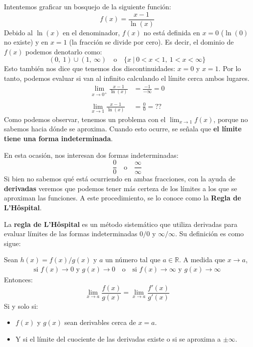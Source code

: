 \documentclass[12pt]{article}
\begin{document}
Intentemos graficar un bosquejo de la siguiente función:
\[
	f(x) = \frac{x - 1}{\ln(x)}
\]
Debido al $\ln(x)$ en el denominador, $f(x)$ no está definida en $x = 0$ ($\ln(0)$ no existe) y en $x = 1$ (la fracción se divide por cero). Es decir, el dominio de $f(x)$ podemos denotarlo como:
\[
(0, \ 1) \cup (1, \ \infty) \quad \text{o} \quad 
\{x \ | \ 0 < x < 1, \ 1 < x < \infty\}
\]
Esto también nos dice que tenemos dos discontinuidades: $x = 0$ y $x = 1$. Por lo tanto, podemos evaluar si van al infinito calculando el límite cerca ambos lugares.
\begin{align*}
\lim_{x \to 0^{+}} \frac{x - 1}{\ln(x)} &=
	\frac{-1}{-\infty} = 0 \\ \\
\lim_{x \to 1} \frac{x - 1}{\ln(x)} &=
	\frac{0}{0} = \text{??}
\end{align*}
Como podemos observar, tenemos un problema con el $\lim_{x \to 1} f(x)$, porque no sabemos hacia dónde se aproxima. Cuando esto ocurre, se señala que \textbf{el límite tiene una forma indeterminada}.

En esta ocasión, nos interesan dos formas indeterminadas:
\begin{equation*}
\frac{0}{0} \quad \text{o} \quad \frac{\infty}{\infty}
\end{equation*}
Si bien no sabemos qué está ocurriendo en ambas fracciones, con la ayuda de \textbf{derivadas} veremos que podemos tener más certeza de los límites a los que se aproximan las funciones. A este procedimiento, se lo conoce como la \textbf{Regla de L'Hôspital}.

La \textbf{regla de L'Hôspital} es un método sistemático que utiliza derivadas para evaluar límites de las formas indeterminadas $0/0$ y $\infty / \infty$. Su definición es como sigue:

Sean $h(x) = f(x)/g(x)$ y $a$ un número tal que $a \in \mathbb{R}$. A medida que $x \to a$,
\begin{align*}
\text{si } f(x) \to 0 \text{ y } g(x) \to 0
\quad \text{o} \quad
\text{si } f(x) \to \infty \text{ y } g(x) \to \infty
\end{align*}
Entonces:
\[
\lim_{x \to a} \frac{f(x)}{g(x)} = \lim_{x \to a} \frac{f'(x)}{g'(x)}
\]
Si y solo si:

\begin{itemize}
\item $f(x)$ y $g(x)$ sean derivables cerca de $x = a$.

\item Y si el límite del cuociente de las derivadas existe o si se aproxima a $\pm \infty$.
\end{itemize}
\end{document}
